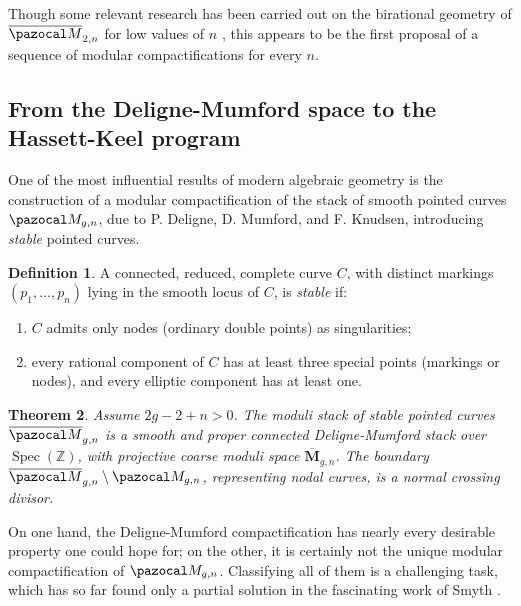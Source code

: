 \documentclass[11pt]{amsart}
\newcommand{\oM}{\overline{\pazocal M}}
\theoremstyle{plain}
\newtheorem{thm}{Theorem}[section]
\theoremstyle{definition}
\newtheorem{dfn}[thm]{Definition}
\begin{document}
Though some relevant research has been carried out on the birational geometry of $\oM_{2,n}$ for low values of $n$ \cite{Hassettg2,HL-tricanonical,Rulla,HL-birational_contraction, FedorchukGrimes,PolishchukJohnson}, this appears to be the first proposal of a sequence of modular compactifications for every $n$.

\subsection{From the Deligne-Mumford space to the Hassett-Keel program} One of the most influential results of modern algebraic geometry is the construction of a modular compactification of the stack of smooth pointed curves $\pazocal M_{g,n}$, due to P. Deligne, D. Mumford, and F. Knudsen, introducing \emph{stable} pointed curves.

\begin{dfn}\cite{DM}
 A connected, reduced, complete curve $C$, with distinct markings $(p_1,\ldots,p_n)$ lying in the smooth locus of $C$, is \emph{stable} if:
 \begin{enumerate}[leftmargin=.7cm]
  \item $C$ admits only nodes (ordinary double points) as singularities;
  \item every rational component of $C$ has at least three special points (markings or nodes), and every elliptic component has at least one.
 \end{enumerate}
\end{dfn}

\begin{thm} \cite{DM,Knudsen}
 Assume $2g-2+n>0$. The moduli stack of stable pointed curves $\oM_{g,n}$ is a smooth and proper connected Deligne-Mumford stack over $\operatorname{Spec}(\mathbb Z)$, with projective coarse moduli space $\overline{\mathbf M}_{g,n}$. The boundary $\oM_{g,n}\setminus\pazocal M_{g,n}$, representing nodal curves, is a normal crossing divisor.
\end{thm}
On one hand, the Deligne-Mumford compactification has nearly every desirable property one could hope for; on the other, it is certainly not the unique modular compactification of $\pazocal M_{g,n}$. Classifying all of them is a challenging task, which has so far found only a partial solution in the fascinating work of Smyth \cite{SMY-towards}.%
\end{document}
